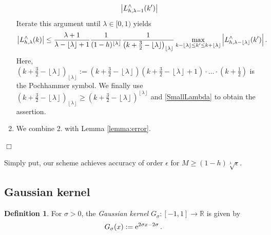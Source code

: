 \documentclass[11pt,a4paper,twoside,bibtotoc]{scrartcl}
\theoremstyle{plain}
\theoremstyle{definition}
\newtheorem{definition}[theorem]{Definition}
\theoremstyle{remark}
\newenvironment{proof}{{\bf Proof.}}{$\Box$}
\newcommand{\R}{\ensuremath{\mathbb{R}}}
\newcommand{\abs}[1]{\ensuremath{\left\vert#1\right\vert}}
\newcommand{\interv}[4]{\ensuremath{\left#1\left.#2,#3\right#4\right.}}
\newcommand{\fun}[2]{\ensuremath{#1{\hspace{-0.4ex}}\left(#2\right)}}
\newcommand{\paren}[1]{\ensuremath{\left(#1\right)}}
\newcommand{\encl}[3]{\ensuremath{\left#1#2\right#3}}
\newcommand{\e}{\mbox{\rm{e}}}
\newcommand{\floor}[1]{\encl{\lfloor}{#1}{\rfloor}}
\numberwithin{equation}{section}
\numberwithin{table}{section}
\numberwithin{figure}{section}
\begin{document}
\begin{proof}
\begin{enumerate}
\begin{eqnarray*}
      \left|\fun{L_{h,\lambda-1}^{\wedge}}{k'}\right|
    \end{eqnarray*}
    Iterate this argument until $\lambda \in [0,1)$ yields
    \begin{align*}
      \left|\fun{L_{h,\lambda}^{\wedge}}{k}\right|
      & \le \frac{\lambda+1}{\lambda-\floor{\lambda}+1} \frac{1}{(1-h)^{\floor{\lambda}}}
        \frac{1}{\paren{k+\frac{3}{2}-\floor{\lambda}}_{\floor{\lambda}}} 
        \max_{k-\floor{\lambda} \le k' \le k+\floor{\lambda}} 
        \abs{\fun{L_{h,\lambda-\floor{\lambda}}^{\wedge}}{k'}}.
    \end{align*}
    Here, $\paren{k+\frac{3}{2}-\floor{\lambda}}_{\floor{\lambda}} := 
    \paren{k+\frac{3}{2}-\floor{\lambda}} \paren{k+\frac{3}{2}-\floor{\lambda}+1}
    \cdot \ldots \cdot 
    \paren{k+\frac{1}{2}}$ is the Pochhammer symbol. We finally use 
    $\paren{k+\frac{3}{2}-\floor{\lambda}}_{\floor{\lambda}} \ge
    \paren{k+\frac{3}{2}-\floor{\lambda}}^{\floor{\lambda}}$ and 
    \eqref{SmallLambda} to obtain the assertion.
  \item We combine 2. with Lemma \ref{lemma:error}. 
  \end{enumerate}
\end{proof}

Simply put, our scheme achieves accuracy of order $\epsilon$ for $M \ge
(1-h)\sqrt[\lambda]{\epsilon}$.

\subsection{Gaussian kernel}
\begin{definition}
  For $\sigma>0$, the \emph{Gaussian kernel}
  $G_{\sigma}:\interv{[}{-1}{1}{]} \rightarrow \R$ is given by
  \begin{equation}
    \label{GaussKernel}
    \nonumber
    \fun{G_{\sigma}}{x} := \e^{2\sigma x-2\sigma}\,.
  \end{equation}
\end{definition}
\end{document}
